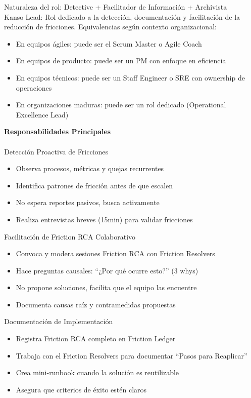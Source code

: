 Naturaleza del rol: Detective + Facilitador de Información + Archivista\\

Kanso Lead: Rol dedicado a la detección, documentación y facilitación de la reducción de fricciones.
Equivalencias según contexto organizacional:

\begin{itemize}
    \item En equipos ágiles: puede ser el Scrum Master o Agile Coach
    \item En equipos de producto: puede ser un PM con enfoque en eficiencia
    \item En equipos técnicos: puede ser un Staff Engineer o SRE con ownership de operaciones
    \item En organizaciones maduras: puede ser un rol dedicado (Operational Excellence Lead)
\end{itemize}

\textbf{Responsabilidades Principales}
\\
\\
Detección Proactiva de Fricciones
\begin{itemize}
    \item Observa procesos, métricas y quejas recurrentes
    \item Identifica patrones de fricción antes de que escalen
    \item No espera reportes pasivos, busca activamente
    \item Realiza entrevistas breves (15min) para validar fricciones
\end{itemize}

Facilitación de Friction RCA Colaborativo
\begin{itemize}
    \item Convoca y modera sesiones Friction RCA con Friction Resolvers
    \item Hace preguntas causales: ``¿Por qué ocurre esto?'' (3 whys)
    \item No propone soluciones, facilita que el equipo las encuentre
    \item Documenta causas raíz y contramedidas propuestas
\end{itemize}

Documentación de Implementación
\begin{itemize}
    \item Registra Friction RCA completo en Friction Ledger
    \item Trabaja con el Friction Resolvers para documentar ``Pasos para Reaplicar''
    \item Crea mini-runbook cuando la solución es reutilizable
    \item Asegura que criterios de éxito estén claros
\end{itemize}

